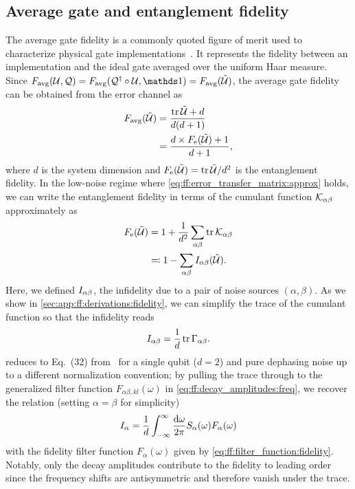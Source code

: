 \subsection{Average gate and entanglement fidelity}\label{sec:ff:theory:derived_quantities:entanglement_fidelity}
The average gate fidelity is a commonly quoted figure of merit used to characterize physical gate implementations~\cite{Loss1998,Ladd2010,Chow2012,Veldhorst2014,Yoneda2018}.
It represents the fidelity between an implementation \liouvU and the ideal gate \liouvQ averaged over the uniform Haar measure.
Since $\avgfid(\liouvU, \liouvQ) = \avgfid(\liouvQ\adjoint\circ\liouvU, \eye) = \avgfid(\liouvUe)$, the average gate fidelity can be obtained from the error channel \liouvUe as~\cite{Horodecki1999,Nielsen2002}
\begin{align}
    F_{\mathrm{avg}}(\mathcal{\tilde{U}}) &= \frac{\tr\mathcal{\tilde{U}} + d}{d(d+1)} \label{eq:ff:fidelity:avg}\\
                      &= \frac{d\times F_{\mathrm{e}}(\mathcal{\tilde{U}}) + 1}{d + 1}, \label{eq:ff:fidelity:avg-ent}
\end{align}
where $d$ is the system dimension and $F_{\mathrm{e}}(\mathcal{\tilde{U}}) = \tr\mathcal{\tilde{U}} / d^2$ is the entanglement fidelity.
In the low-noise regime where \cref{eq:ff:error_transfer_matrix:approx} holds, we can write the entanglement fidelity in terms of the cumulant function $\mathcal{K}_{\alpha\beta}$ approximately as
\begin{align}\label{eq:ff:fidelity:ent}
    F_{\mathrm{e}}(\mathcal{\tilde{U}}) &= 1 + \frac{1}{d^2}\sum_{\alpha\beta}\tr\mathcal{K}_{\alpha\beta} \\
                      &\eqqcolon 1 - \sum_{\alpha\beta}I_{\alpha\beta}(\mathcal{\tilde{U}}).
\end{align}
Here, we defined $I_{\alpha\beta}$, the infidelity due to a pair of noise sources $(\alpha,\beta)$.
As we show in \cref{sec:app:ff:derivations:fidelity}, we can simplify the trace of the cumulant function so that the infidelity reads
\begin{equation}\label{eq:ff:infidelity:ent}
    I_{\alpha\beta} = \frac{1}{d}\tr\Gamma_{\alpha\beta}.
\end{equation}
 reduces to Eq.~(32) from~ for a single qubit ($d=2$) and pure dephasing noise up to a different normalization convention; by pulling the trace through to the generalized filter function $F_{\alpha\beta,kl}(\omega)$ in \cref{eq:ff:decay_amplitudes:freq}, we recover the relation (setting $\alpha=\beta$ for simplicity)
\begin{equation}\label{eq:ff:infidelity:ent:integral}
    I_{\alpha} = \frac{1}{d}\int_{-\infty}^\infty\frac{\dd{\omega}}{2\pi} S_{\alpha}(\omega) F_{\alpha}(\omega)
\end{equation}
with the fidelity filter function $F_{\alpha}(\omega)$ given by \cref{eq:ff:filter_function:fidelity}.
Notably, only the decay amplitudes \decayamps contribute to the fidelity to leading order since the frequency shifts \freqshifts are antisymmetric and therefore vanish under the trace.

